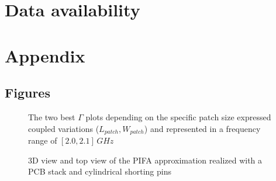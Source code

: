 \documentclass[10pt,a4paper,twocolumn]{article}
\begin{document}
{\section*{Data availability}







\twocolumn[{
	\begin{@twocolumnfalse} 
		\printbibliography

	\listoffigures
\end{@twocolumnfalse}
}
]
\clearpage

	\section*{Appendix}


	\subsection*{Figures}


	\begin{figure}[b!]
		\begin{subfigure}{0.48\linewidth}
			\def\svgwidth{\linewidth}
			\tiny{}
						\caption{}
		\end{subfigure}
	\hfill
		\begin{subfigure}{0.48\linewidth}
			\def\svgwidth{\linewidth}
			\tiny{}
			\caption{}
		\end{subfigure}
		\caption{The two best $\Gamma$ plots depending on the specific patch size expressed coupled variations ($L_{patch},W_{patch}$) and represented in a frequency range of $[2.0,2.1]\,GHz$}
		\label{fig:Gamma couple LpWp}
	\end{figure}
	\begin{figure}[b!]
		\begin{subfigure}{0.45\linewidth}
			\def\svgwidth{\linewidth}
			\tiny{}
		\end{subfigure}
	\hfill
		\begin{subfigure}{0.45\linewidth}
			\def\svgwidth{\linewidth}
			\tiny{}
		\end{subfigure}
		\caption{3D view and top view of the PIFA approximation realized with a PCB stack and cylindrical shorting pins}
		\label{fig:pcb shorting}
	\end{figure}


}
\end{document}
